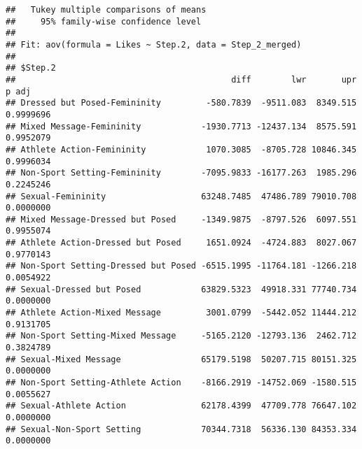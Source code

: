 \documentclass[
]{article}
\newenvironment{Shaded}{\begin{snugshade}}{\end{snugshade}}
\newcommand{\CommentTok}[1]{\textcolor[rgb]{0.56,0.35,0.01}{\textit{#1}}}
\newcommand{\FloatTok}[1]{\textcolor[rgb]{0.00,0.00,0.81}{#1}}
\newcommand{\FunctionTok}[1]{\textcolor[rgb]{0.00,0.00,0.00}{#1}}
\newcommand{\NormalTok}[1]{#1}
\newcommand{\OtherTok}[1]{\textcolor[rgb]{0.56,0.35,0.01}{#1}}
\newcommand{\SpecialCharTok}[1]{\textcolor[rgb]{0.00,0.00,0.00}{#1}}
\begin{document}
\begin{verbatim}
##   Tukey multiple comparisons of means
##     95% family-wise confidence level
## 
## Fit: aov(formula = Likes ~ Step.2, data = Step_2_merged)
## 
## $Step.2
##                                           diff        lwr       upr     p adj
## Dressed but Posed-Femininity         -580.7839  -9511.083  8349.515 0.9999696
## Mixed Message-Femininity            -1930.7713 -12437.134  8575.591 0.9952079
## Athlete Action-Femininity            1070.3085  -8705.728 10846.345 0.9996034
## Non-Sport Setting-Femininity        -7095.9833 -16177.263  1985.296 0.2245246
## Sexual-Femininity                   63248.7485  47486.789 79010.708 0.0000000
## Mixed Message-Dressed but Posed     -1349.9875  -8797.526  6097.551 0.9955074
## Athlete Action-Dressed but Posed     1651.0924  -4724.883  8027.067 0.9770143
## Non-Sport Setting-Dressed but Posed -6515.1995 -11764.181 -1266.218 0.0054922
## Sexual-Dressed but Posed            63829.5323  49918.331 77740.734 0.0000000
## Athlete Action-Mixed Message         3001.0799  -5442.052 11444.212 0.9131705
## Non-Sport Setting-Mixed Message     -5165.2120 -12793.136  2462.712 0.3824789
## Sexual-Mixed Message                65179.5198  50207.715 80151.325 0.0000000
## Non-Sport Setting-Athlete Action    -8166.2919 -14752.069 -1580.515 0.0055627
## Sexual-Athlete Action               62178.4399  47709.778 76647.102 0.0000000
## Sexual-Non-Sport Setting            70344.7318  56336.130 84353.334 0.0000000
\end{verbatim}

\begin{Shaded}
\end{Shaded}
\end{document}
